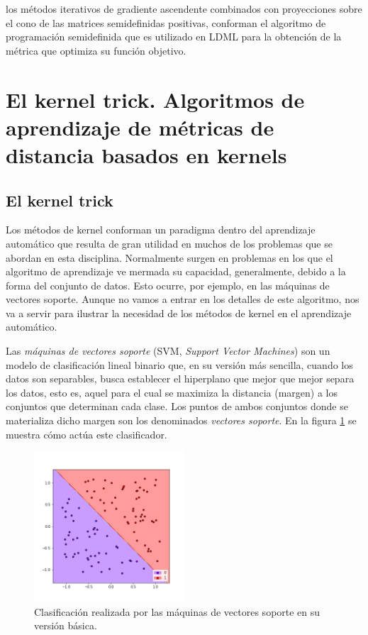 los métodos iterativos de gradiente ascendente combinados con proyecciones sobre el cono de las matrices semidefinidas positivas, conforman el algoritmo de programación semidefinida que es utilizado en LDML para la obtención de la métrica que optimiza su función objetivo.




\section{El kernel trick. Algoritmos de aprendizaje de métricas de distancia basados en kernels}

\subsection{El kernel trick}

Los métodos de kernel conforman un paradigma dentro del aprendizaje automático que resulta de gran utilidad en muchos de los problemas que se abordan en esta disciplina. Normalmente surgen en problemas en los que el algoritmo de aprendizaje ve mermada su capacidad, generalmente, debido a la forma del conjunto de datos. Esto ocurre, por ejemplo, en las máquinas de vectores soporte. Aunque no vamos a entrar en los detalles de este algoritmo, nos va a servir para ilustrar la necesidad de los métodos de kernel en el aprendizaje automático.

Las \emph{máquinas de vectores soporte} (SVM, \emph{Support Vector Machines}) son un modelo de clasificación lineal binario que, en su versión más sencilla, cuando los datos son separables, busca establecer el hiperplano que mejor que mejor separa los datos, esto es, aquel para el cual se maximiza la distancia (margen) a los conjuntos que determinan cada clase. Los puntos de ambos conjuntos donde se materializa dicho margen son los denominados \emph{vectores soporte}. En la figura \ref{fig:svm_ejemplo} se muestra cómo actúa este clasificador.

\begin{figure}[h]
    \centering
    \includegraphics[width=0.5\textwidth]{images/svm_example.png}
    \caption{Clasificación realizada por las máquinas de vectores soporte en su versión básica.} \label{fig:svm_ejemplo}
\end{figure} 

